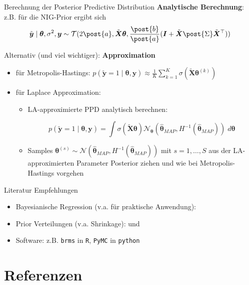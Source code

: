 \documentclass[
  ignorenonframetext,
  aspectratio=169,
]{beamer}
\providecommand{\tightlist}{%
  \setlength{\itemsep}{0pt}\setlength{\parskip}{0pt}}
\newcommand{\by}{\bm{y}}
\newcommand{\bI}{\bm{I}}
\newcommand{\Ncal}{\mathcal{N}}
\newcommand{\Tcal}{\mathcal{T}}
\newcommand{\ssd}{\sigma^2}
\newcommand{\btheta}{\bm{\theta}}
\newcommand{\hbtheta}{\hat{\bm{\theta}}}
\newcommand{\Sdpo}{\post{\Sigma}}
\newcommand{\apo}{\post{a}}
\newcommand{\bpo}{\post{b}}
\newcommand{\ty}{\tilde{\bm{y}}}
\newcommand{\tX}{\tilde{\bm{X}}}
\begin{document}
\begin{frame}{Berechnung der Posterior Predictive Distribution}
\protect{}\label{berechnung-der-posterior-predictive-distribution}
\textbf{Analytische Berechnung}: z.B. für die NIG-Prior ergibt sich
\[\ty \mid \btheta, \ssd, \by \sim \Tcal(2 \apo, \tX \btheta, \frac{\bpo}{\apo} (\bI + \tX \Sdpo \tX^\top))\]

Alternativ (und viel wichtiger): \textbf{Approximation}

\begin{itemize}
\tightlist
\item
  für Metropolis-Hastings:
  \(p(\ty = 1 \mid \btheta, \by) \approx \frac{1}{K} \sum_{k=1}^{K} \sigma(\tX \btheta^{(k)})\)
\item
  für Laplace Approximation:

  \begin{itemize}
  \item
    LA-approximierte PPD analytisch berechnen:

    \[p(\ty = 1 \mid \btheta, \by) = \int \sigma(\tX \btheta) \Ncal_{\btheta}(\hbtheta_{MAP}, H^{-1} (\hbtheta_{MAP})) \; d \btheta\]
  \item
    Samples
    \(\btheta^{(s)} \sim \Ncal(\hbtheta_{MAP}, H^{-1}(\hbtheta_{MAP}))\)
    mit \(s = 1, \dots, S\) aus der LA-approximierten Parameter
    Posterior ziehen und wie bei Metropolis-Hastings vorgehen
  \end{itemize}
\end{itemize}
\end{frame}

\begin{frame}[fragile]{Literatur Empfehlungen}
\protect{}\label{literatur-empfehlungen}
\begin{itemize}
\tightlist
\item
  Bayesianische Regression (v.a. für praktische Anwendung):
  \textcite{gelman_bayesian_2013}
\item
  Prior Verteilungen (v.a. Shrinkage): \textcite{van_erp_shrinkage_2019}
  und \textcite{celeux_regularization_2012}
\item
  Software: z.B. \texttt{brms} in \texttt{R}, \texttt{PyMC} in
  \texttt{python}
\end{itemize}
\end{frame}

\section{Referenzen}\label{referenzen}
\end{document}
